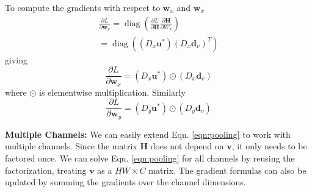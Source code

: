 \documentclass[final]{cvpr}
\DeclareMathOperator{\diag}{diag}
\begin{document}
To compute the gradients with respect to $\mathbf{w}_x$ and $\mathbf{w}_x$
\begin{align}
    \frac{\partial L}{\partial \mathbf{w}_x} = \diag\left( \frac{\partial L}{\partial \mathbf{H}} \frac{\partial \mathbf{H}}{\partial W_x} \right) \\
    = \diag\left((D_x \mathbf{u}^*)(D_x \mathbf{d}_v)^T \right)
\end{align}
giving
\begin{equation}
    \frac{\partial L}{\partial \mathbf{w}_x} = (D_x \mathbf{u}^*) \odot (D_x \mathbf{d}_v)
\end{equation}
where $\odot$ is elementwise multiplication. Similarly
\begin{equation}
    \frac{\partial L}{\partial \mathbf{w}_y} = (D_y \mathbf{u}^*) \odot (D_y \mathbf{d}_v)
\end{equation}

\vspace{1mm} \noindent \textbf{Multiple Channels:} We can easily extend Eqn. \ref{eqn:pooling} to work with multiple channels. Since the matrix $\mathbf{H}$ does not depend on $\mathbf{v}$, it only needs to be factored once. We can solve Eqn. \ref{eqn:pooling} for all channels by reusing the factorization, treating $\mathbf{v}$ as a $HW \times C$ matrix. The gradient formulas can also be updated by summing the gradients over the channel dimensions.







\clearpage{}
\end{document}
